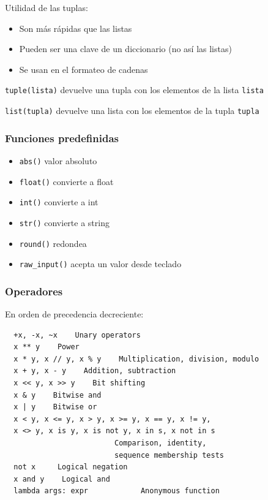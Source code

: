 \documentclass{beamer}
\begin{document}
\begin{frame}[fragile]

Utilidad de las tuplas:
\begin{itemize}
\item Son más rápidas que las listas
\item Pueden ser una clave de un diccionario (no así las listas)
\item Se usan en el formateo de cadenas
\end{itemize} 

\verb|tuple(lista)| devuelve una tupla con los elementos de la lista \verb|lista|

\verb|list(tupla)| devuelve una lista con los elementos de la tupla \verb|tupla|

\end{frame} 





\begin{frame}[fragile]
\frametitle{Funciones predefinidas}  
\begin{itemize}
  
\item 
\verb|abs()|   valor absoluto
\item 
\verb|float()|  convierte a float
\item 
\verb|int()|  convierte a int
\item 
\verb|str()|  convierte a string
\item 
\verb|round()|  redondea
\item 
\verb|raw_input()|  acepta un valor desde teclado


\end{itemize}
\end{frame}




\begin{frame}[fragile]
  \begin{center}
\frametitle{Operadores }
En orden de precedencia decreciente:
  \end{center}
  

  \begin{footnotesize}
\begin{verbatim}
  +x, -x, ~x    Unary operators
  x ** y    Power 
  x * y, x // y, x % y    Multiplication, division, modulo
  x + y, x - y    Addition, subtraction
  x << y, x >> y    Bit shifting
  x & y    Bitwise and
  x | y    Bitwise or
  x < y, x <= y, x > y, x >= y, x == y, x != y,
  x <> y, x is y, x is not y, x in s, x not in s  
                         Comparison, identity, 
                         sequence membership tests
  not x     Logical negation
  x and y    Logical and
  lambda args: expr            Anonymous function
\end{verbatim}
  \end{footnotesize}

\end{frame}
\end{document}
